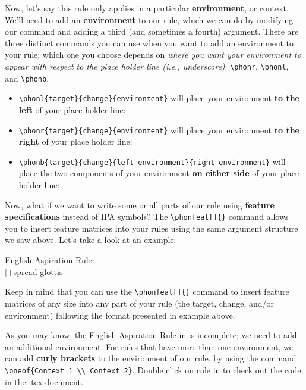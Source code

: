 \documentclass[output=paper,colorlinks,citecolor=brown,
]{langscibook}
\begin{document}
Now, let's say this rule only applies in a particular \textbf{environment}, or context. We'll need to add an \textbf{environment} to our rule, which we can do by modifying our command and adding a third (and sometimes a fourth) argument. There are three distinct commands you can use when you want to add an environment to your rule; which one you choose depends on \textit{where you want your environment to appear with respect to the place holder line (i.e., underscore)}: \verb|\phonr|, \verb|\phonl|, and \verb|\phonb|.
\begin{itemize}
    \item \verb|\phonl{target}{change}{environment}| will place your environment \textbf{to the left} of your place holder line: 
    \item \verb|\phonr{target}{change}{environment}| will place your environment \textbf{to the right} of your place holder line: \phonr{e}{i}{]\subs{word}}
    \item \verb|\phonb{target}{change}{left environment}{right environment}| will place the two components of your environment \textbf{on either side} of your place holder line: 
\end{itemize}

Now, what if we want to write some or all parts of our rule using \textbf{feature specifications} instead of IPA symbols? The \verb|\phonfeat[]{}| command allows you to insert feature matrices into your rules using the same argument structure we saw above. Let's take a look at an example:

\ea \label{ex:diercks:EngAspRule}
English Aspiration Rule: \\
{[+spread glottis]}
{} 
\z

\noindent Keep in mind that you can use the \verb|\phonfeat[]{}| command to insert feature matrices of any size into any part of your rule (the target, change, and/or environment) following the format presented in example  above.

As you may know, the English Aspiration Rule in  is incomplete; we need to add an additional environment. For rules that have more than one environment, we can add \textbf{curly brackets} to the environment of our rule, by using the command \verb|\oneof{Context 1 \\ Context 2}|. Double click on rule in  to check out the code in the .tex document.
\end{document}
